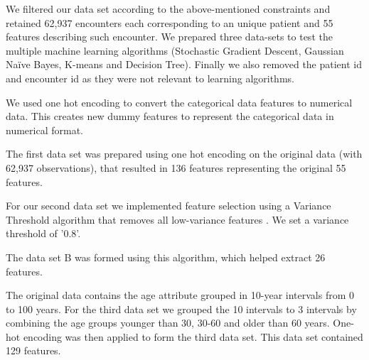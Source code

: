 \documentclass[9pt,twocolumn,twoside]{../../styles/osajnl}
\begin{document}
We filtered our data set according to the above-mentioned constraints and retained  62,937 encounters each corresponding to an unique patient and 55 features describing such encounter. We prepared three data-sets to test the multiple machine learning algorithms (Stochastic Gradient Descent, Gaussian Naïve Bayes, K-means and Decision Tree).  Finally we also removed the patient id and encounter id  as they were not relevant to learning algorithms.

We used one hot encoding to convert the categorical data features  to numerical data. This creates new dummy features to represent the categorical data in numerical format.

The first data set was prepared using one hot encoding on the original data (with 62,937 observations), that resulted in 136 features representing the original 55 features.

For our second data set we implemented feature selection using a Variance Threshold algorithm that removes all low-variance features \cite{www-vt}. We set a variance threshold of '0.8'.

The data set B was formed using this algorithm, which helped extract 26 features.

The original data contains the age attribute grouped in 10-year intervals from 0 to 100 years. For the third data set we grouped the 10 intervals to 3 intervals by combining the age groups younger than 30, 30-60 and older than 60 years. One-hot encoding was then applied to form the third data set. This data set contained 129 features.
\end{document}
